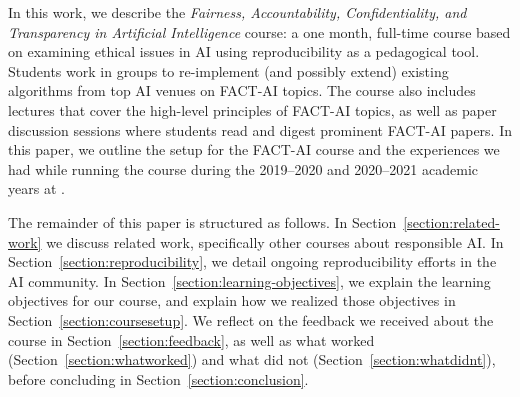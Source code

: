 In this work, we describe the \textit{Fairness, Accountability, Confidentiality, and Transparency in Artificial Intelligence} course: a one month, full-time course based on examining ethical issues in AI using reproducibility as a pedagogical tool. 
Students work in groups to re-implement (and possibly extend) existing algorithms from top AI venues on \ac{FACT-AI} topics. 
The course also includes lectures that cover the high-level principles of FACT-AI topics, as well as paper discussion sessions where students read and digest prominent FACT-AI papers. 
In this paper, we outline the setup for the \ac{FACT-AI} course and the experiences we had while running the course during the 2019--2020 and 2020--2021 academic years at \OurUniversity{}. 

The remainder of this paper is structured as follows. 
In Section~\ref{section:related-work} we discuss related work, specifically other courses about responsible AI. 
In Section~\ref{section:reproducibility}, we detail ongoing reproducibility efforts in the AI community. 
In Section~\ref{section:learning-objectives}, we explain the learning objectives for our course, and explain how we realized those objectives in Section~\ref{section:coursesetup}. 
We reflect on the feedback we received about the course in Section~\ref{section:feedback}, as well as what worked (Section~\ref{section:whatworked}) and what did not (Section~\ref{section:whatdidnt}), before concluding in Section~\ref{section:conclusion}. 

